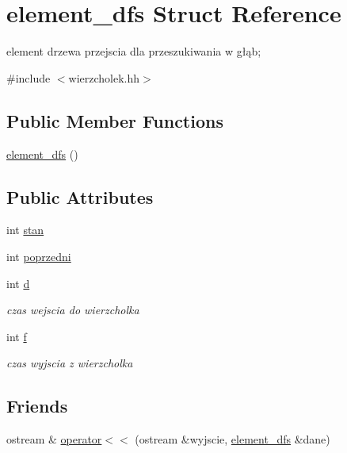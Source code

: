 \hypertarget{structelement__dfs}{\section{element\-\_\-dfs \-Struct \-Reference}
\label{structelement__dfs}
}


element drzewa przejscia dla przeszukiwania w głąb;  




{\ttfamily \#include $<$wierzcholek.\-hh$>$}

\subsection*{\-Public \-Member \-Functions}
\begin{DoxyCompactItemize}
\item 
\hyperlink{structelement__dfs_a7a70ed0a00bcaafd111e9b07a135bbe4}{element\-\_\-dfs} ()
\end{DoxyCompactItemize}
\subsection*{\-Public \-Attributes}
\begin{DoxyCompactItemize}
\item 
int \hyperlink{structelement__dfs_a48b8257c62eb0f4c52e10bf2c06fffda}{stan}
\item 
int \hyperlink{structelement__dfs_af3205a446fe8c834532d3b5de81deefa}{poprzedni}
\item 
int \hyperlink{structelement__dfs_ae2d3c82805dc8b9b24a7dc1511c283dd}{d}
\begin{DoxyCompactList}\small\item\em czas wejscia do wierzcholka \end{DoxyCompactList}\item 
int \hyperlink{structelement__dfs_a9a75ad927680701485941a4e42b36290}{f}
\begin{DoxyCompactList}\small\item\em czas wyjscia z wierzcholka \end{DoxyCompactList}\end{DoxyCompactItemize}
\subsection*{\-Friends}
\begin{DoxyCompactItemize}
\item 
ostream \& \hyperlink{structelement__dfs_abb6d36003fb4e11d878e4bd1d794469b}{operator$<$$<$} (ostream \&wyjscie, \hyperlink{structelement__dfs}{element\-\_\-dfs} \&dane)
\end{DoxyCompactItemize}


